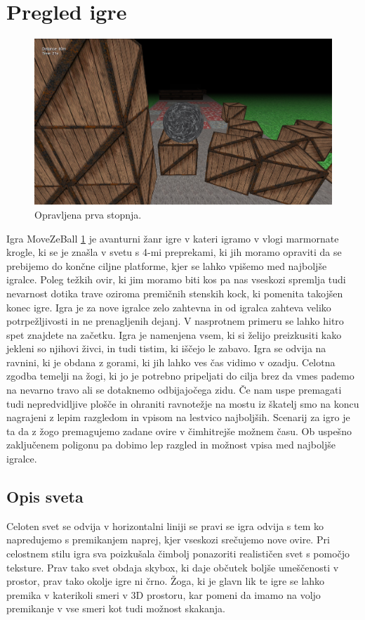 \documentclass[a4paper]{article}
\begin{document}
\section{Pregled igre}
\begin{figure}[!htb]
    \begin{center}
        \includegraphics[width=\columnwidth]{moveZeBall.jpg}
        \caption{Opravljena prva stopnja.} \label{fig:slika}
    \end{center}
\end{figure}
Igra MoveZeBall \ref{fig:slika} je avanturni žanr igre v kateri igramo v vlogi marmornate krogle, ki se je znašla v svetu s 4-mi preprekami, ki jih moramo opraviti da se prebijemo do končne ciljne platforme, kjer se lahko vpišemo med najboljše igralce. Poleg težkih ovir, ki jim moramo biti kos pa nas vseskozi spremlja tudi nevarnost dotika trave oziroma premičnih stenskih kock, ki pomenita takojšen konec igre. Igra je za nove igralce zelo zahtevna in od igralca zahteva veliko potrpežljivosti in ne prenagljenih dejanj. V nasprotnem primeru se lahko hitro spet znajdete na začetku. Igra je namenjena vsem, ki si želijo preizkusiti kako jekleni so njihovi živci, in tudi tistim, ki iščejo le zabavo. Igra se odvija na ravnini, ki je obdana z gorami, ki jih lahko ves čas vidimo v ozadju. Celotna zgodba temelji na žogi, ki jo je potrebno pripeljati do cilja brez da vmes pademo na nevarno travo ali se dotaknemo odbijajočega zidu. Če nam uspe premagati tudi nepredvidljive plošče in ohraniti ravnotežje na mostu iz škatelj smo na koncu nagrajeni z lepim razgledom in vpisom na lestvico najboljših.  Scenarij za igro je ta da z žogo premagujemo zadane ovire v čimhitrejše možnem času. Ob uspešno zaključenem poligonu pa dobimo lep razgled in možnost vpisa med najboljše igralce.


\subsection{Opis sveta}
Celoten svet se odvija v horizontalni liniji se pravi se igra odvija s tem ko napredujemo s premikanjem naprej, kjer vseskozi srečujemo nove ovire. Pri celostnem stilu igra sva poizkušala čimbolj ponazoriti realističen svet s pomočjo teksture. Prav tako svet obdaja skybox, ki daje občutek boljše umeščenosti v prostor, prav tako okolje igre ni črno. Žoga, ki je glavn lik te igre se lahko premika v katerikoli smeri v 3D prostoru, kar pomeni da imamo na voljo premikanje v vse smeri kot tudi možnost skakanja.
\end{document}
